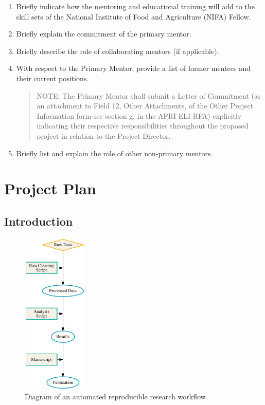 \documentclass[12pt,letterpaper]{article}
\begin{document}
\begin{enumerate}

  \item Briefly indicate how the mentoring and educational training will add to the
   skill sets of the National Institute of Food and Agriculture (NIFA) Fellow.

  \item Briefly explain the commitment of the primary mentor.

  \item Briefly describe the role of collaborating mentors (if applicable).

  \item With respect to the Primary Mentor, provide a list of former mentees and
   their current positions. 
   \begin{quote}
   NOTE: The Primary Mentor shall submit a Letter of Commitment (as an
   attachment to Field 12, Other Attachments, of the Other Project
   Information form-see section g. in the AFRI ELI RFA) explicitly
   indicating their respective responsibilities throughout the proposed
   project in relation to the Project Director.
   \end{quote}

  \item Briefly list and explain the role of other non-primary mentors.

\end{enumerate}



\section{Project Plan}




\subsection{Introduction}

\begin{figure} %
  \includegraphics[width=0.275\textwidth]{figure/rr.pdf}
  \caption{Diagram of an automated reproducible research workflow}
  \label{fig:rr}
\end{figure}
\end{document}
